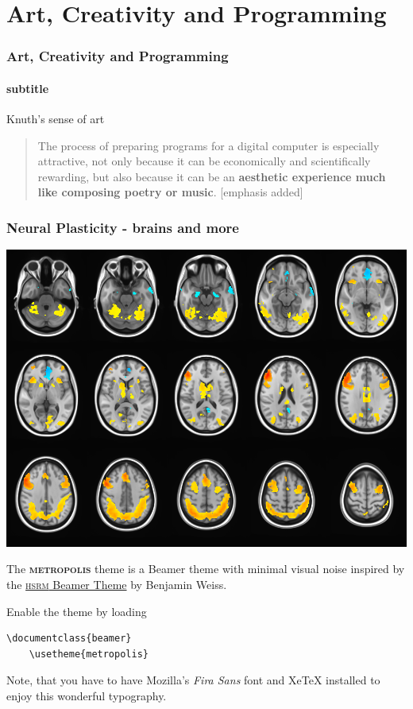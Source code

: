 \documentclass[10pt]{beamer}
\newcommand{\themename}{\textbf{\textsc{metropolis}}\xspace}
\begin{document}
\section{Art, Creativity and Programming}

\begin{frame}[fragile]
  \frametitle{Art, Creativity and Programming}
  \framesubtitle{subtitle}
  Knuth's sense of art\cite{Knuth1974Computer}

    \begin{quote}
    The process of preparing programs for a digital computer is especially attractive, not only because it can be economically and scientifically rewarding, but also because it can be an \textbf{aesthetic experience much like composing poetry or music}. [emphasis added]
    \end{quote}
    \cite[v]{Knuth1974Computer}
\end{frame}

\begin{frame}
  \frametitle{Neural Plasticity - brains and more}
  \begin{center}
    \includegraphics[height=0.75\textheight]{./media/fmri-example.png}
  \end{center}
\end{frame}



\begin{frame}[fragile]{}

  The \themename theme is a Beamer theme with minimal visual noise
  inspired by the \href{https://github.com/hsrmbeamertheme/hsrmbeamertheme}{\textsc{hsrm} Beamer
  Theme} by Benjamin Weiss.

  Enable the theme by loading

  \begin{verbatim}\documentclass{beamer}
    \usetheme{metropolis}\end{verbatim}

  Note, that you have to have Mozilla's \emph{Fira Sans} font and XeTeX
  installed to enjoy this wonderful typography.
\end{frame}
\end{document}
